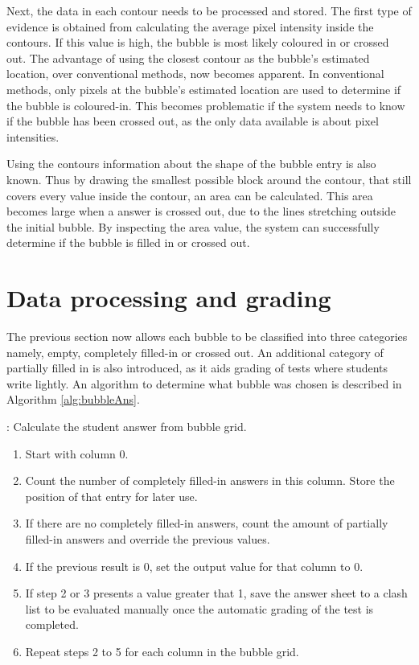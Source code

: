 Next, the data in each contour needs to be processed and stored. The first type of evidence is obtained from calculating the average pixel intensity inside the contours. If this value is high, the bubble is most likely coloured in or crossed out. The advantage of using the closest contour as the bubble's estimated location, over conventional methods, now becomes apparent. In conventional methods, only pixels at the bubble's estimated location are used to determine if the bubble is coloured-in. This becomes problematic if the system needs to know if the bubble has been crossed out, as the only data available is about pixel intensities. 

Using the contours information about the shape of the bubble entry is also known. Thus by drawing the smallest possible block around the contour, that still covers every value inside the contour, an area can be calculated. This area becomes large when a answer is crossed out, due to the lines stretching outside the initial bubble. By inspecting the area value, the system can successfully determine if the bubble is filled in or crossed out.

\section{Data processing and grading}

The previous section now allows each bubble to be classified into three categories namely, empty, completely filled-in or crossed out. An additional category of partially filled in is also introduced, as it aids grading of tests where students write lightly. An algorithm to determine what bubble was chosen is described in Algorithm \ref{alg:bubbleAns}.

\begin{algorithm}[H]
\caption{: Calculate the student answer from bubble grid.}
\label{alg:bubbleAns}
\begin{enumerate}
\item Start with column 0.
\item Count the number of completely filled-in answers in this column. Store the position of that entry for later use.
\item If there are no completely filled-in answers, count the amount of partially filled-in answers and override the previous values.
\item If the previous result is 0, set the output value for that column to 0.
\item If step 2 or 3 presents a value greater that 1, save the answer sheet to a clash list to be evaluated manually once the automatic grading of the test is completed.
\item Repeat steps 2 to 5 for each column in the bubble grid.
\end{enumerate}
\end{algorithm}



